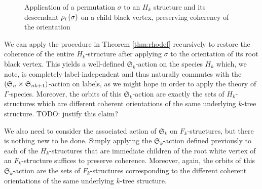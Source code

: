 \documentclass[sectionflow,singlespace,twoside,boldmathhdr]{brandiss} %
\numberwithin{section}{chapter}
\numberwithin{figure}{chapter}
\begin{document}
\begin{figure}[htbp]
  \centering
  \caption{Application of a permutation $\sigma$ to an $H_{k}$ structure and its descendant $\rho_{i} \left( {\sigma} \right)$ on a child black vertex, preserving coherency of the orientation}
  \label{fig:rhoapp}
\end{figure}

We can apply the procedure in Theorem \ref{thm:rhodef} recursively to restore the coherence of the entire $H_{k}$-structure after applying $\sigma$ to the orientation of its root black vertex.
This yields a well-defined $\mathfrak{S}_{k}$-action on the species $H_{k}$ which, we note, is completely label-independent and thus naturally commutes with the $\left( {\mathfrak{S}_{n} \times \mathfrak{S}_{nk+1}} \right)$-action on labels, as we might hope in order to apply the theory of $\Gamma$-species.
Moreover, the orbits of this $\mathfrak{S}_{k}$-action are exactly the sets of $H_{k}$-structures which are different coherent orientations of the same underlying $k$-tree structure.
TODO: justify this claim?

We also need to consider the associated action of $\mathfrak{S}_{k}$ on $F_{k}$-structures, but there is nothing new to be done.
Simply applying the $\mathfrak{S}_{k}$-action defined previously to each of the $H_{k}$-structures that are immediate children of the root white vertex of an $F_{k}$-structure suffices to preserve coherence.
Moreover, again, the orbits of this $\mathfrak{S}_{k}$-action are the sets of $F_{k}$-structures corresponding to the different coherent orientations of the same underlying $k$-tree structure.
\end{document}
